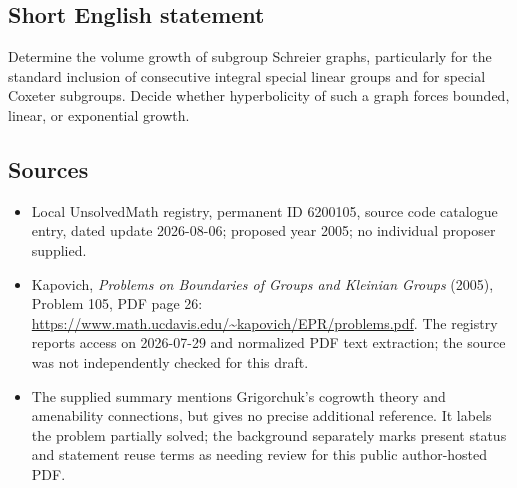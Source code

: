 \documentclass[11pt]{article}
\begin{document}
\subsection{Short English statement}
Determine the volume growth of subgroup Schreier graphs, particularly for the standard inclusion of consecutive integral special linear groups and for special Coxeter subgroups. Decide whether hyperbolicity of such a graph forces bounded, linear, or exponential growth.
\subsection{Sources}
\begin{itemize}
\item Local UnsolvedMath registry, permanent ID 6200105, source code catalogue entry, dated update 2026-08-06; proposed year 2005; no individual proposer supplied.
\item Kapovich, \emph{Problems on Boundaries of Groups and Kleinian Groups} (2005), Problem 105, PDF page 26: \url{https://www.math.ucdavis.edu/~kapovich/EPR/problems.pdf}. The registry reports access on 2026-07-29 and normalized PDF text extraction; the source was not independently checked for this draft.
\item The supplied summary mentions Grigorchuk's cogrowth theory and amenability connections, but gives no precise additional reference. It labels the problem partially solved; the background separately marks present status and statement reuse terms as needing review for this public author-hosted PDF.
\end{itemize}
\end{document}
